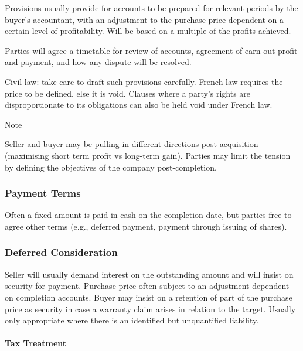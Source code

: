 \documentclass[
]{article}
\newenvironment{env-48e9bfc8-c3dd-4504-a5fa-3b34b9a27ccf}
{
    \savenotes\tcolorbox[blanker,breakable,left=5pt,borderline west={2pt}{-4pt}{blue}]
}
{
    \endtcolorbox\spewnotes
}
\begin{document}
Provisions usually provide for accounts to be prepared for relevant
periods by the buyer's accountant, with an adjustment to the purchase
price dependent on a certain level of profitability. Will be based on a
multiple of the profits achieved.

Parties will agree a timetable for review of accounts, agreement of
earn-out profit and payment, and how any dispute will be resolved.

Civil law: take care to draft such provisions carefully. French law
requires the price to be defined, else it is void. Clauses where a
party's rights are disproportionate to its obligations can also be held
void under French law.

\begin{env-48e9bfc8-c3dd-4504-a5fa-3b34b9a27ccf}

Note

Seller and buyer may be pulling in different directions post-acquisition
(maximising short term profit vs long-term gain). Parties may limit the
tension by defining the objectives of the company post-completion.

\end{env-48e9bfc8-c3dd-4504-a5fa-3b34b9a27ccf}

\hypertarget{payment-terms}{%
\subsubsection{Payment Terms}\label{payment-terms}}

Often a fixed amount is paid in cash on the completion date, but parties
free to agree other terms (e.g., deferred payment, payment through
issuing of shares).

\hypertarget{deferred-consideration}{%
\subsubsection{Deferred Consideration}\label{deferred-consideration}}

Seller will usually demand interest on the outstanding amount and will
insist on security for payment. Purchase price often subject to an
adjustment dependent on completion accounts. Buyer may insist on a
retention of part of the purchase price as security in case a warranty
claim arises in relation to the target. Usually only appropriate where
there is an identified but unquantified liability.

\hypertarget{tax-treatment}{%
\paragraph{Tax Treatment}\label{tax-treatment}}
\end{document}
